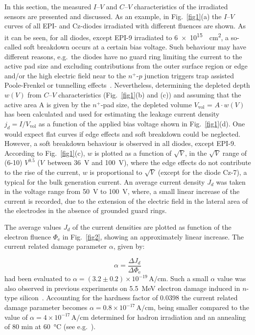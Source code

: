 \documentclass[final, 5p, times]{elsarticle}
\begin{document}
In this section, the measured $I$--$V$ and $C$--$V$ characteristics of the irradiated sensors are presented and discussed. As an example, in Fig.~\ref{fig1}(a) the $I$--$V$ curves of all EPI- and Cz-diodes irradiated with different fluences are shown. As it can be seen, for all diodes, except EPI-9 irradiated to \SI{6e15}{\per\square\centi\meter}, a so-called soft breakdown occurs at a certain bias voltage. Such behaviour may have different reasons, e.g.\ the diodes have no guard ring limiting the current to the active pad size and excluding contributions from the outer surface region or edge and/or the high electric field near to the $n^+$-$p$ junction triggers trap assisted Poole-Frenkel or tunnelling effects~\cite{b20,b21}. Nevertheless, determining the depleted depth $w(V)$ from $C$--$V$ characteristics (Fig.~\ref{fig1}(b) and (c)) and assuming that the active area A is given by the $n^+$-pad size, the depleted volume $V_\text{vol}$ = $A \cdot w(V)$ has been calculated and used for estimating the leakage current density $j_d = I/V_\text{vol}$ as a function of the applied bias voltage shown in Fig.~\ref{fig1}(d). One would expect flat curves if edge effects and soft breakdown could be neglected. However, a soft breakdown behaviour is observed in all diodes, except EPI-9. According to Fig.~\ref{fig1}(c), $w$ is plotted as a function of $\sqrt{V}$, in the $\sqrt{V}$ range of (6-10) $\si{V^{0.5}}$ ($V$~between 36~V and 100~V), where the edge effects do not contribute to the rise of the current, $w$ is proportional to $\sqrt{V}$ (except for the diode Cz-7), a typical for the bulk generation current. An average current density $J_d$ was taken in the voltage range from \SI{50}{\volt} to \SI{100}{\volt}, where, a small linear increase of the current is recorded, due to the extension of the electric field in the lateral area of the electrodes in the absence of grounded guard rings. 

\par


The average values $J_{d}$ of the current densities are plotted as function of the electron fluence $\Phi_\text{e}$ in Fig.~\ref{fig2}, showing an
approximately linear increase. The current related damage
parameter $\alpha$, given by:
\par
\begin{equation}
  \alpha = \frac{\Delta J_d}{\Delta \Phi_\text{e}}
\end{equation}
had been evaluated to $\alpha = (3.2 \pm 0.2) \times 10^{-19}\,\si{\ampere\per\centi\meter}$. Such a small $\alpha$ value was also observed in previous experiments on \SI{5.5}{\mega\electronvolt} electron damage induced in $n$-type silicon~\cite{b22}. Accounting for the hardness factor of 0.0398 the current related damage parameter becomes $\alpha = 0.8 \times 10^{-17}\,\si{\ampere\per\centi\meter}$, being smaller compared to the value of $\alpha = 4\times 10^{-17}\,\si{\ampere\per\centi\meter}$ determined for hadron irradiation and an annealing of 80 min at \SI{60}{\celsius} (see e.g.~\cite{b18,b23,b24}). 
\par
\end{document}
